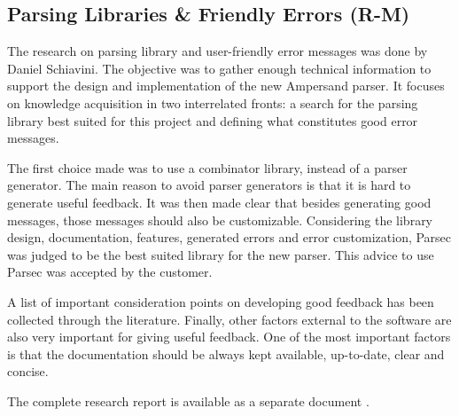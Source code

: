 

\subsection{Parsing Libraries \& Friendly Errors (R-M)}
\label{domain:parsing}
The research on parsing library and user-friendly error messages was done by Daniel Schiavini.
The objective was to gather enough technical information to support the design and implementation of the new Ampersand parser.
It focuses on knowledge acquisition in two interrelated fronts: a search for the parsing library best suited for this project and defining what constitutes good error messages.

The first choice made was to use a combinator library, instead of a parser generator.
The main reason to avoid parser generators is that it is hard to generate useful feedback.
It was then made clear that besides generating good messages, those messages should also be customizable.
Considering the library design, documentation, features, generated errors and error customization, Parsec was judged to be the best suited library for the new parser.
This advice to use Parsec was accepted by the customer.

A list of important consideration points on developing good feedback has been collected through the literature.
Finally, other factors external to the software are also very important for giving useful feedback.
One of the most important factors is that the documentation should be always kept available, up-to-date, clear and concise.

The complete research report is available as a separate document .
